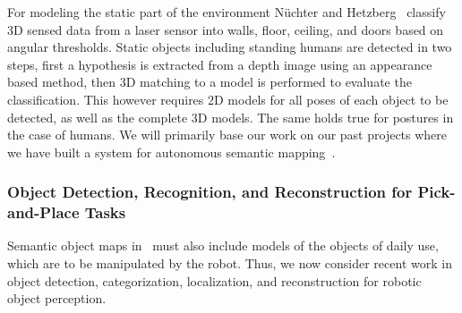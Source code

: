 
For modeling the static part of the environment N\"uchter and
Hetzberg~\cite{nuechter08semanticmaps} classify 3D sensed data from a
laser sensor into walls, floor, ceiling, and doors based on angular
thresholds. Static objects including standing humans are detected
in two steps, first a hypothesis is extracted from a depth image
using an appearance based method, then 3D matching to a model is
performed to evaluate the classification. This however requires 2D
models for all poses of each object to be detected, as well as the
complete 3D models. The same holds true for postures in the case of humans.
We will primarily base our work on our past projects where we have built a
system for autonomous semantic mapping~\cite{mapping11iros}.
\subsubsection{Object Detection, Recognition, and Reconstruction for Pick-and-Place Tasks}
\label{sec:objects}
Semantic object maps in \ksem\ must also include models of the objects of daily use, which
are to be manipulated by the robot. Thus, we now consider recent
work in object detection, categorization, localization, and
reconstruction for robotic object perception.




